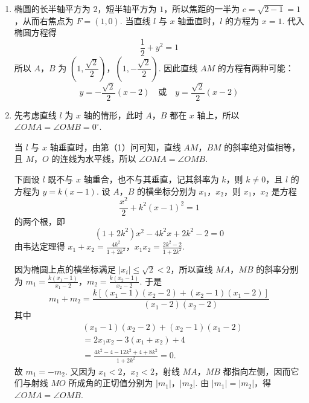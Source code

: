 \begin{solution}
\begin{enumerate}
\item 椭圆的长半轴平方为 \(2\)，短半轴平方为 \(1\)，所以焦距的一半为 \(c=\sqrt{2-1}=1\)，从而右焦点为 \(F=(1,0)\). 当直线 \(l\) 与 \(x\) 轴垂直时，\(l\) 的方程为 \(x=1\). 代入椭圆方程得
\[
\frac12+y^2=1
\]
所以 \(A\)，\(B\) 为 \(\left(1,\dfrac{\sqrt2}{2}\right)\)，\(\left(1,-\dfrac{\sqrt2}{2}\right)\). 因此直线 \(AM\) 的方程有两种可能：
\[
y=-\frac{\sqrt2}{2}(x-2)\quad\text{或}\quad y=\frac{\sqrt2}{2}(x-2)
\]

\item 先考虑直线 \(l\) 为 \(x\) 轴的情形，此时 \(A\)，\(B\) 都在 \(x\) 轴上，所以 \(\angle OMA=\angle OMB=0^\circ\).

当 \(l\) 与 \(x\) 轴垂直时，由第（1）问可知，直线 \(AM\)，\(BM\) 的斜率绝对值相等，且 \(M\)，\(O\) 的连线为水平线，所以 \(\angle OMA=\angle OMB\).

下面设 \(l\) 既不与 \(x\) 轴重合，也不与其垂直，记其斜率为 \(k\)，则 \(k\ne0\)，且 \(l\) 的方程为 \(y=k(x-1)\). 设 \(A\)，\(B\) 的横坐标分别为 \(x_1\)，\(x_2\)，则 \(x_1\)，\(x_2\) 是方程
\[
\frac{x^2}{2}+k^2(x-1)^2=1
\]
的两个根，即
\[
(1+2k^2)x^2-4k^2x+2k^2-2=0
\]
由韦达定理得
\(x_1+x_2=\frac{4k^2}{1+2k^2}\)，\(x_1x_2=\frac{2k^2-2}{1+2k^2}\).

因为椭圆上点的横坐标满足 \(|x_i|\le\sqrt2<2\)，所以直线 \(MA\)，\(MB\) 的斜率分别为
\(m_1=\frac{k(x_1-1)}{x_1-2}\)，\(m_2=\frac{k(x_2-1)}{x_2-2}\).
于是
\[
m_1+m_2=\frac{k\left[(x_1-1)(x_2-2)+(x_2-1)(x_1-2)\right]}{(x_1-2)(x_2-2)}
\]
其中
\[
\begin{aligned}
&(x_1-1)(x_2-2)+(x_2-1)(x_1-2)\\
&=2x_1x_2-3(x_1+x_2)+4\\
&=\frac{4k^2-4-12k^2+4+8k^2}{1+2k^2}=0.
\end{aligned}
\]
故 \(m_1=-m_2\). 又因为 \(x_1<2\)，\(x_2<2\)，射线 \(MA\)，\(MB\) 都指向左侧，因而它们与射线 \(MO\) 所成角的正切值分别为 \(|m_1|\)，\(|m_2|\). 由 \(|m_1|=|m_2|\)，得 \(\angle OMA=\angle OMB\).
\end{enumerate}
\end{solution}

